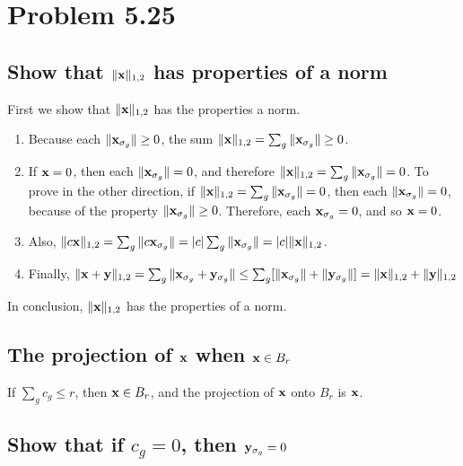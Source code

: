 \documentclass{scrartcl}
\begin{document}
\section*{Problem 5.25}

\subsection*{Show that $\|\mathbf{x}\|_{1,2}$ has properties of a norm}

First we show that $\|\mathbf{x}\|_{1,2}$ has the properties a norm.
\begin{enumerate}
\item Because each $\|\mathbf{x}_{\sigma_g}\| \ge 0$, the sum $\|\mathbf{x}\|_{1,2} = \sum_{g} \|\mathbf{x}_{\sigma_g}\| \ge 0$.
\item If $\mathbf{x} = 0$, then each  $\|\mathbf{x}_{\sigma_g}\| = 0$, and therefore $\|\mathbf{x}\|_{1,2} = \sum_{g} \|\mathbf{x}_{\sigma_g}\| = 0$.
To prove in the other direction, if $\|\mathbf{x}\|_{1,2} = \sum_{g} \|\mathbf{x}_{\sigma_g}\| = 0$, then each $\|\mathbf{x}_{\sigma_g}\| = 0$,
because of the property $\|\mathbf{x}_{\sigma_g}\| \ge 0$. Therefore, each $\mathbf{x}_{\sigma_g} = 0$, and so $\mathbf{x} = 0$.
\item Also, $\|c\mathbf{x}\|_{1,2} = \sum_{g} \|c\mathbf{x}_{\sigma_g}\| = |c|\sum_{g} \|\mathbf{x}_{\sigma_g}\| = |c|\|\mathbf{x}\|_{1,2}$.
\item Finally, $\|\mathbf{x}+\mathbf{y}\|_{1,2} = \sum_{g} \|\mathbf{x}_{\sigma_g}+\mathbf{y}_{\sigma_g}\|
\le \sum_{g} [ \|\mathbf{x}_{\sigma_g}\| + \|\mathbf{y}_{\sigma_g}\| ] = \|\mathbf{x}\|_{1,2} + \|\mathbf{y}\|_{1,2}$
\end{enumerate}
In conclusion, $\|\mathbf{x}\|_{1,2}$ has the properties of a norm.

\subsection*{The projection of $\mathbf{x}$ when $\mathbf{x} \in B_r$}

If $\sum_g c_g \le r$, then $\mathbf{x} \in B_r$, and the projection of $\mathbf{x}$ onto $B_r$ is $\mathbf{x}$.

\subsection*{Show that if $c_g = 0$, then $\mathbf{y}_{\sigma_g} = 0$}
\end{document}
